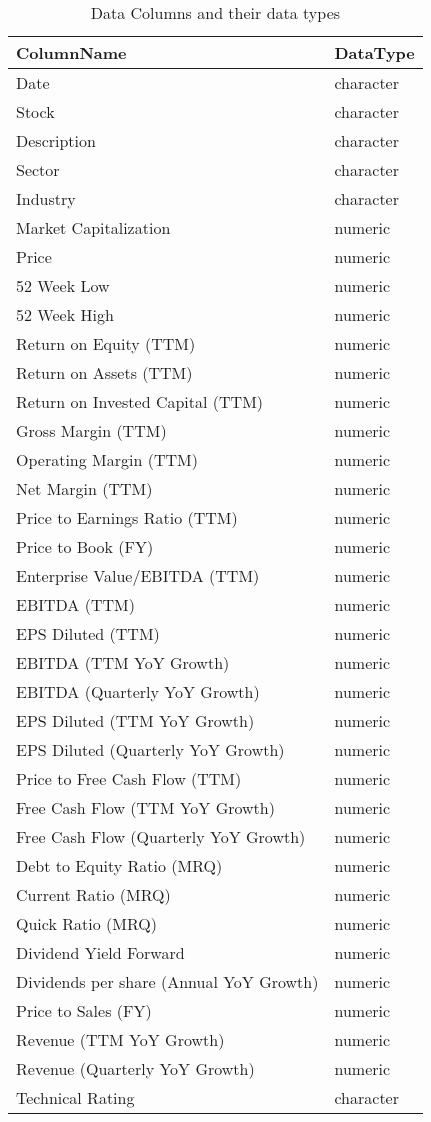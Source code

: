 \documentclass[
  letterpaper,
  DIV=11,
  numbers=noendperiod]{scrreport}
\begin{document}
\begin{table}

\caption{Data Columns and their data types}
\centering
\begin{tabular}[t]{l|l}
\hline
ColumnName & DataType\\
\hline
Date & character\\
\hline
Stock & character\\
\hline
Description & character\\
\hline
Sector & character\\
\hline
Industry & character\\
\hline
Market Capitalization & numeric\\
\hline
Price & numeric\\
\hline
52 Week Low & numeric\\
\hline
52 Week High & numeric\\
\hline
Return on Equity (TTM) & numeric\\
\hline
Return on Assets (TTM) & numeric\\
\hline
Return on Invested Capital (TTM) & numeric\\
\hline
Gross Margin (TTM) & numeric\\
\hline
Operating Margin (TTM) & numeric\\
\hline
Net Margin (TTM) & numeric\\
\hline
Price to Earnings Ratio (TTM) & numeric\\
\hline
Price to Book (FY) & numeric\\
\hline
Enterprise Value/EBITDA (TTM) & numeric\\
\hline
EBITDA (TTM) & numeric\\
\hline
EPS Diluted (TTM) & numeric\\
\hline
EBITDA (TTM YoY Growth) & numeric\\
\hline
EBITDA (Quarterly YoY Growth) & numeric\\
\hline
EPS Diluted (TTM YoY Growth) & numeric\\
\hline
EPS Diluted (Quarterly YoY Growth) & numeric\\
\hline
Price to Free Cash Flow (TTM) & numeric\\
\hline
Free Cash Flow (TTM YoY Growth) & numeric\\
\hline
Free Cash Flow (Quarterly YoY Growth) & numeric\\
\hline
Debt to Equity Ratio (MRQ) & numeric\\
\hline
Current Ratio (MRQ) & numeric\\
\hline
Quick Ratio (MRQ) & numeric\\
\hline
Dividend Yield Forward & numeric\\
\hline
Dividends per share (Annual YoY Growth) & numeric\\
\hline
Price to Sales (FY) & numeric\\
\hline
Revenue (TTM YoY Growth) & numeric\\
\hline
Revenue (Quarterly YoY Growth) & numeric\\
\hline
Technical Rating & character\\
\hline
\end{tabular}
\end{table}
\end{document}
